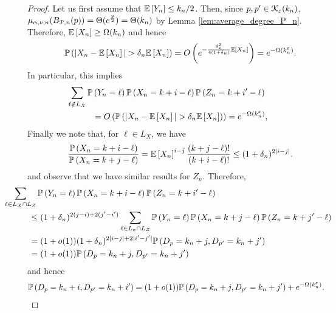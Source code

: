 \begin{appendices}
\begin{proof}
Let us first assume that $\mathbb{E}\left[Y_n\right] \le k_n/2$. Then, since $p,p^\prime \in {\mathcal K}_{\varepsilon}(k_n)$, $\mu_{\alpha,\nu,n}(B_{{\mathcal P},n}(p)) = \Theta(e^{\frac{y}{2}}) = \Theta(k_n)$ by Lemma \ref{lem:average_degree_P_n}. Therefore, $\mathbb{E}\left[X_n\right] \ge \Omega(k_n)$ and hence
\[
	\mathbb{P}\left(|X_n - \mathbb{E}\left[X_n\right]| > \delta_n \mathbb{E}\left[X_n\right]\right) = O\left(e^{-\frac{\delta_n^2}{4(1+\delta_n)} \mathbb{E}\left[X_n\right]}\right) = e^{-\Omega(k_n^\varepsilon)}.
\]
In particular, this implies
\begin{align*}
	&\hspace{-30pt}\sum_{\ell \notin L_X} \Prob{Y_n = \ell} \Prob{X_n = k + i - \ell} 
			\Prob{Z_n = k + i^\prime - \ell}\\
	&= \bigO{\Prob{|X_n - \Exp{X_n}| > \delta_n \Exp{X_n}}} = e^{-\Omega(k_n^\varepsilon)},
\end{align*}
Finally we note that, for $\ell \in L_X$, we have
\begin{equation}\label{eq:fraction_degree_prob}
	\frac{\mathbb{P}\left(X_n = k + i - \ell\right)}{\mathbb{P}\left(X_n = k + j - \ell\right)} = \mathbb{E}\left[X_n\right]^{i - j} \frac{(k + j - \ell)!}{(k + i - \ell)!}
	\le (1 + \delta_n)^{2|i - j|}.
\end{equation}
and observe that we have similar results for $Z_n$. Therefore,
\begin{align*}
	&\hspace{-30pt}\sum_{\ell \in L_X \cap L_Z} \Prob{Y_n = \ell} \Prob{X_n = k + i - \ell} 
		\Prob{Z_n = k + i^\prime - \ell} \\
	&\le (1+\delta_n)^{2(j-i) + 2(j^\prime - i^\prime)} \sum_{\ell \in L_x \cap L_Z} 
			\Prob{Y_n = \ell} \Prob{X_n = k + j - \ell} \Prob{Z_n = k + j^\prime - \ell}\\
	&= (1+o(1))(1+\delta_n)^{2|i-j| + 2|i^\prime - j^\prime|}\Prob{D_p = k_n + j, D_{p^\prime} = k_n + j^\prime}\\
	&= (1+o(1))\Prob{D_p = k_n + j, D_{p^\prime} = k_n + j^\prime}
\end{align*}
and hence
\begin{align*}
	\mathbb{P}\left(D_p = k_n + i, D_{p^\prime} = k_n + i^\prime\right)
	&= (1+o(1))\mathbb{P}\left(D_p = k_n + j, D_{p^\prime} = k_n + j^\prime\right) + e^{-\Omega(k_n^\varepsilon)}.
\end{align*}


\end{proof}
\end{appendices}
